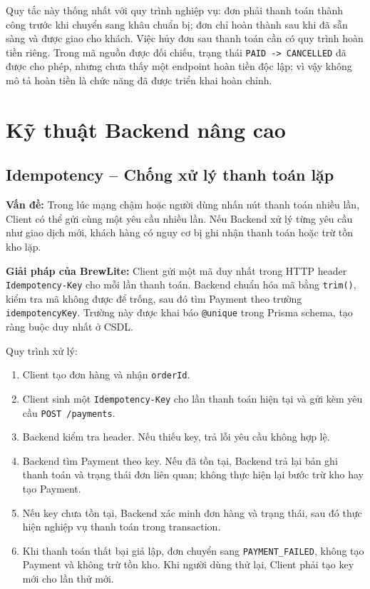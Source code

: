 Quy tắc này thống nhất với quy trình nghiệp vụ: đơn phải thanh toán thành công trước khi chuyển sang khâu chuẩn bị; đơn chỉ hoàn thành sau khi đã sẵn sàng và được giao cho khách. Việc hủy đơn sau thanh toán cần có quy trình hoàn tiền riêng. Trong mã nguồn được đối chiếu, trạng thái \texttt{PAID -> CANCELLED} đã được cho phép, nhưng chưa thấy một endpoint hoàn tiền độc lập; vì vậy không mô tả hoàn tiền là chức năng đã được triển khai hoàn chỉnh.

\section{Kỹ thuật Backend nâng cao}
\label{sec:backend-advanced}

\subsection{Idempotency -- Chống xử lý thanh toán lặp}

\textbf{Vấn đề:} Trong lúc mạng chậm hoặc người dùng nhấn nút thanh toán nhiều lần, Client có thể gửi cùng một yêu cầu nhiều lần. Nếu Backend xử lý từng yêu cầu như giao dịch mới, khách hàng có nguy cơ bị ghi nhận thanh toán hoặc trừ tồn kho lặp.

\textbf{Giải pháp của BrewLite:} Client gửi một mã duy nhất trong HTTP header \texttt{Idempotency-Key} cho mỗi lần thanh toán. Backend chuẩn hóa mã bằng \texttt{trim()}, kiểm tra mã không được để trống, sau đó tìm Payment theo trường \texttt{idempotencyKey}. Trường này được khai báo \texttt{@unique} trong Prisma schema, tạo ràng buộc duy nhất ở CSDL.

Quy trình xử lý:
\begin{enumerate}
    \item Client tạo đơn hàng và nhận \texttt{orderId}.
    \item Client sinh một \texttt{Idempotency-Key} cho lần thanh toán hiện tại và gửi kèm yêu cầu \texttt{POST /payments}.
    \item Backend kiểm tra header. Nếu thiếu key, trả lỗi yêu cầu không hợp lệ.
    \item Backend tìm Payment theo key. Nếu đã tồn tại, Backend trả lại bản ghi thanh toán và trạng thái đơn liên quan; không thực hiện lại bước trừ kho hay tạo Payment.
    \item Nếu key chưa tồn tại, Backend xác minh đơn hàng và trạng thái, sau đó thực hiện nghiệp vụ thanh toán trong transaction.
    \item Khi thanh toán thất bại giả lập, đơn chuyển sang \texttt{PAYMENT\_FAILED}, không tạo Payment và không trừ tồn kho. Khi người dùng thử lại, Client phải tạo key mới cho lần thử mới.
\end{enumerate}

